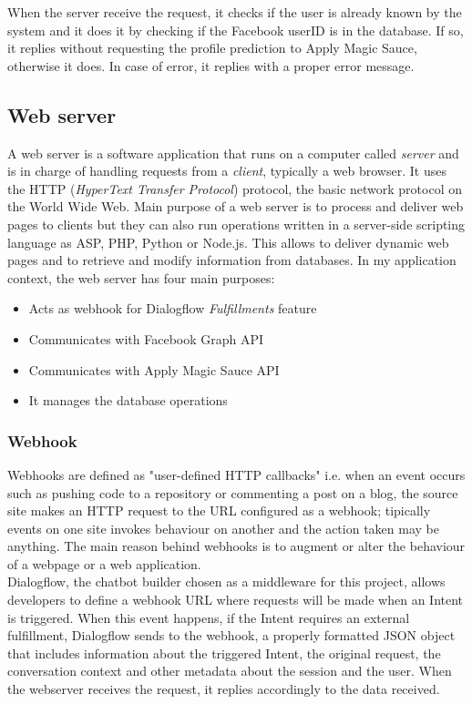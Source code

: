\documentclass[b5paper,10pt,twoside,cucitura]{toptesi}
\begin{document}
\noindent
When the server receive the request, it checks if the user is already known by the system and it does it by checking if the Facebook userID is in the database. If so, it replies without requesting the profile prediction to Apply Magic Sauce, otherwise it does. In case of error, it replies with a proper error message. 

\subsection{Web server}

A web server is a software application that runs on a computer called \textit{server} and is in charge of handling requests from a \textit{client}, typically a web browser. It uses the HTTP (\textit{HyperText Transfer Protocol}) protocol, the basic network protocol on the World Wide Web. Main purpose of a web server is to process and deliver web pages to clients but they can also run operations written in a server-side scripting language as ASP, PHP, Python or Node.js. This allows to deliver dynamic web pages and to retrieve and modify information from databases.
In my application context, the web server has four main purposes:
\begin{itemize}
    \item Acts as webhook for Dialogflow \textit{Fulfillments} feature
    \item Communicates with Facebook Graph API
    \item Communicates with Apply Magic Sauce API
    \item It manages the database operations
\end{itemize}

\subsubsection{Webhook}
Webhooks are defined as "user-defined HTTP callbacks"  \citep{fitz} i.e. when an event occurs such as pushing code to a repository or commenting a post on a blog, the source site makes an HTTP request to the URL configured as a webhook; tipically events on one site invokes behaviour on another and the action taken may be anything. The main reason behind webhooks is to augment or alter the behaviour of a webpage or a web application. 
\\
Dialogflow, the chatbot builder chosen as a middleware for this project, allows developers to define a webhook URL where requests will be made when an Intent is triggered. When this event happens, if the Intent requires an external fulfillment, Dialogflow sends to the webhook, a properly formatted JSON object that includes information about the triggered Intent, the original request, the conversation context and other metadata about the session and the user. When the webserver receives the request, it replies accordingly to the data received.
\end{document}
